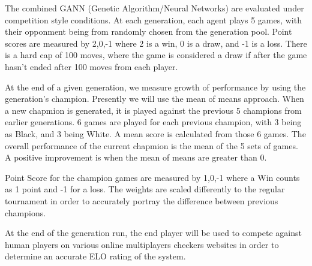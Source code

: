\documentclass[12pt,a4paper]{article}
\begin{document}
    The combined GANN (Genetic Algorithm/Neural Networks) are evaluated under competition style conditions. At each generation, each agent plays 5 games, with their opponment being from randomly chosen from the generation pool. Point scores are measured by {2,0,-1} where 2 is a win, 0 is a draw, and -1 is a loss. There is a hard cap of 100 moves, where the game is considered a draw if after the game hasn't ended after 100 moves from each player.

    At the end of a given generation, we measure growth of performance by using the generation's champion. Presently we will use the mean of means approach. When a new chapmion is generated, it is played against the previous 5 champions from earlier generations. 6 games are played for each previous champion, with 3 being as Black, and 3 being White. A mean score is calculated from those 6 games. The overall performance of the current chapmion is the mean of the 5 sets of games. A positive improvement is when the mean of means are greater than 0. 

    Point Score for the champion games are measured by {1,0,-1} where a Win counts as 1 point and -1 for a loss. The weights are scaled differently to the regular tournament in order to accurately portray the difference between previous champions.

    At the end of the generation run, the end player will be used to compete against human players on various online multiplayers checkers websites in order to determine an accurate ELO rating of the system.









\end{document}
